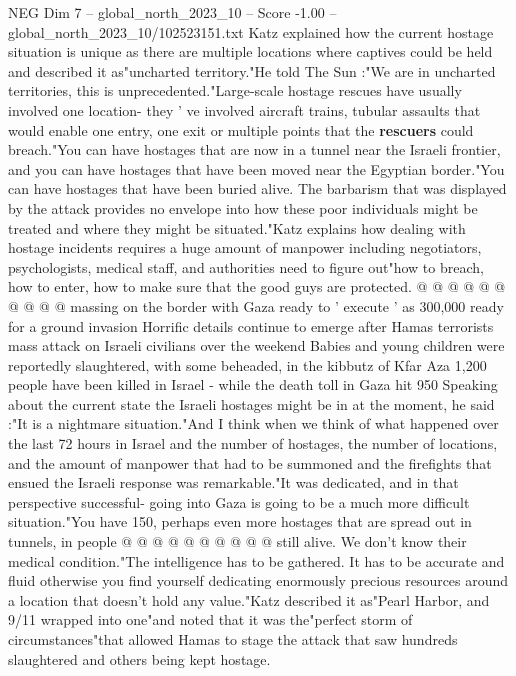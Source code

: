 \begin{textsample}{NEG Dim 7 – global\_north\_2023\_10 – Score -1.00 – global\_north\_2023\_10/102523151.txt}  \label{ex:f7_neg_203}
Katz explained how the current hostage situation is unique as there are multiple locations where captives could be held and described it as"uncharted territory."He told The Sun :"We are in uncharted territories, this is unprecedented."Large-scale hostage rescues have usually involved one location- they ' ve involved aircraft trains, tubular assaults that would enable one entry, one exit or multiple points that the \textbf{rescuers} could breach."You can have hostages that are now in a tunnel near the Israeli frontier, and you can have hostages that have been moved near the Egyptian border."You can have hostages that have been buried alive.
The barbarism that was displayed by the attack provides no envelope into how these poor individuals might be treated and where they might be situated."Katz explains how dealing with hostage incidents requires a huge amount of manpower including negotiators, psychologists, medical staff, and authorities need to figure out"how to breach, how to enter, how to make sure that the good guys are protected. @ @ @ @ @ @ @ @ @ @ massing on the border with Gaza ready to ' execute ' as 300,000 ready for a ground invasion Horrific details continue to emerge after Hamas terrorists mass attack on Israeli civilians over the weekend Babies and young children were reportedly slaughtered, with some beheaded, in the kibbutz of Kfar Aza 1,200 people have been killed in Israel - while the death toll in Gaza hit 950 Speaking about the current state the Israeli hostages might be in at the moment, he said :"It is a nightmare situation."And I think when we think of what happened over the last 72 hours in Israel and the number of hostages, the number of locations, and the amount of manpower that had to be summoned and the firefights that ensued the Israeli response was remarkable."It was dedicated, and in that perspective successful- going into Gaza is going to be a much more difficult situation."You have 150, perhaps even more hostages that are spread out in tunnels, in people @ @ @ @ @ @ @ @ @ @ still alive.
We don't know their medical condition."The intelligence has to be gathered.
It has to be accurate and fluid otherwise you find yourself dedicating enormously precious resources around a location that doesn't hold any value."Katz described it as"Pearl Harbor, and 9/11 wrapped into one"and noted that it was the"perfect storm of circumstances"that allowed Hamas to stage the attack that saw hundreds slaughtered and others being kept hostage.

\end{textsample}
